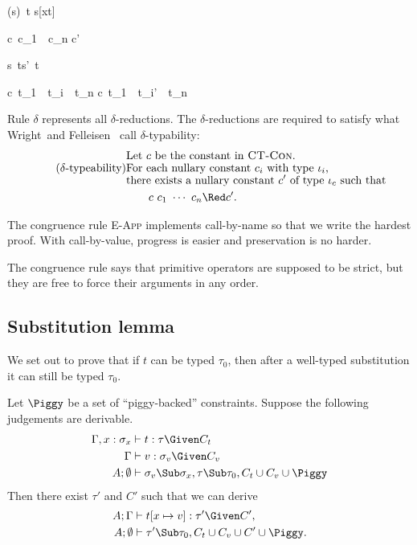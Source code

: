 \documentclass{amsart}
\theoremstyle{definition}
\begin{document}
\infrule[$\beta$]
{}
{(s)~t \Red s[x\mapsto t]}

\infrule[$\delta$]
{}
{c~c_1~\cdots~c_n \Red c'}

{s~t\Red s'~t}

{c~t_1~\cdots~t_i~\cdots~t_n
\Red
c~t_1~\cdots~t_i'~\cdots~t_n
}

Rule \textsc{$\delta$} represents all $\delta$-reductions. The
$\delta$-reductions are required to satisfy what
Wright~and Felleisen~\cite{Wright94} call $\delta$-typability:
\begin{align*}
&\text{Let $c$ be the constant in \textsc{CT-Con}.}\\[-4pt]
\tag{$\delta$-typeability}\label{delta-typability}
&\text{For each nullary constant $c_i$ with type $\iota_i$,}\\[-4pt]
&\text{there exists a nullary constant $c'$ of type $\iota_c$ such that}\\
&\hspace{2em}c~c_1~\cdots~c_n\Red c'.
\end{align*}


The congruence rule \textsc{E-App} implements call-by-name so
that we write the hardest proof. With call-by-value, progress is
easier and preservation is no harder.

The congruence rule  says that primitive operators
are supposed to be strict, but they are free to force their
arguments in any order.

\subsection{Substitution lemma}
\label{sublem}
We set out to prove that if $t$ can be typed $\tau_0$, then after
a well-typed substitution it can still be typed $\tau_0$.

Let $\Piggy$ be a set of ``piggy-backed'' constraints. Suppose
the following judgements are derivable.
\begin{align}
\Gamma,x:\sigma_x&\vdash t:\tau\Given C_t \notag
\\
\Gamma&\vdash v:\sigma_v \Given C_v \notag
\\
A;\emptyset&\vdash
\sigma_v\Sub\sigma_x, \tau\Sub\tau_0,C_t\cup C_v\cup\Piggy
\label{eq:subass}
\end{align}
Then there exist $\tau'$ and $C'$ such that we can derive
\begin{align*}
A;\Gamma&\vdash t[x\mapsto v] : \tau'\Given C',\\
A;\emptyset &\vdash \tau'\Sub\tau_0, C_t\cup C_v\cup C'\cup\Piggy.
\end{align*}
\end{document}
